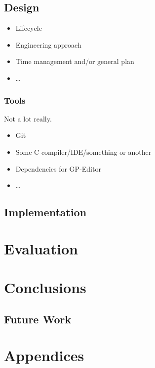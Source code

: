 \documentclass{UoYCSproject}
\begin{document}
\section{Design}
\begin{itemize}
	\item Lifecycle
 	\item Engineering approach
 	\item Time management and/or general plan
	\item \ldots
\end{itemize}
 
\subsection{Tools}
Not a lot really.
\begin{itemize}
  \item Git
  \item Some C compiler/IDE/something or another
  \item Dependencies for GP-Editor
  \item \ldots
\end{itemize}
\section{Implementation}

\chapter{Evaluation}
\chapter{Conclusions}
\section{Future Work}

% 

\chapter{Appendices}
\end{document}
